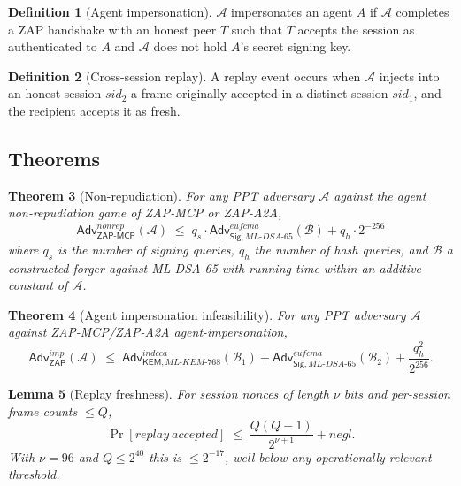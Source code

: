 \documentclass[11pt,a4paper]{article}
\newtheorem{theorem}{Theorem}
\newtheorem{lemma}[theorem]{Lemma}
\theoremstyle{definition}
\newtheorem{definition}[theorem]{Definition}
\theoremstyle{remark}
\newcommand{\zap}{\textsf{ZAP}\xspace}
\newcommand{\zapmcp}{\textsf{ZAP-MCP}\xspace}
\newcommand{\zapaa}{\textsf{ZAP-A2A}\xspace}
\newcommand{\Adv}{\mathsf{Adv}}
\newcommand{\KEM}{\textsf{KEM}}
\newcommand{\Sign}{\textsf{Sig}}
\begin{document}
\begin{definition}[Agent impersonation]
$\mathcal{A}$ impersonates an agent $A$ if $\mathcal{A}$ completes a
\zap{} handshake with an honest peer $T$ such that $T$ accepts the
session as authenticated to $A$ and $\mathcal{A}$ does not hold $A$'s
secret signing key.
\end{definition}

\begin{definition}[Cross-session replay]
A replay event occurs when $\mathcal{A}$ injects into an honest session
$\mathit{sid}_2$ a frame originally accepted in a distinct session
$\mathit{sid}_1$, and the recipient accepts it as fresh.
\end{definition}

\subsection{Theorems}

\begin{theorem}[Non-repudiation]\label{thm:nonrep}
For any PPT adversary $\mathcal{A}$ against the agent
non-repudiation game of \zapmcp{} or \zapaa{},
\[
\Adv^{\mathit{nonrep}}_{\zapmcp{}}(\mathcal{A}) \;\leq\;
q_s \cdot \Adv^{\mathit{eufcma}}_{\Sign,\mathit{ML\text{-}DSA\text{-}65}}(\mathcal{B})
+ q_h \cdot 2^{-256}
\]
where $q_s$ is the number of signing queries, $q_h$ the number of hash
queries, and $\mathcal{B}$ a constructed forger against ML-DSA-65 with
running time within an additive constant of $\mathcal{A}$.
\end{theorem}

\begin{theorem}[Agent impersonation infeasibility]\label{thm:imp}
For any PPT adversary $\mathcal{A}$ against \zapmcp{}/\zapaa{}
agent-impersonation,
\[
\Adv^{\mathit{imp}}_{\zap}(\mathcal{A}) \;\leq\;
\Adv^{\mathit{indcca}}_{\KEM,\mathit{ML\text{-}KEM\text{-}768}}(\mathcal{B}_1)
+ \Adv^{\mathit{eufcma}}_{\Sign,\mathit{ML\text{-}DSA\text{-}65}}(\mathcal{B}_2)
+ \frac{q_h^2}{2^{256}}.
\]
\end{theorem}

\begin{lemma}[Replay freshness]\label{lem:replay}
For session nonces of length $\nu$ bits and per-session frame counts
$\leq Q$,
\[
\Pr[\mathit{replay\ accepted}]
\;\leq\; \frac{Q(Q-1)}{2^{\nu+1}} + \mathit{negl}.
\]
With $\nu = 96$ and $Q \leq 2^{40}$ this is $\leq 2^{-17}$, well below
any operationally relevant threshold.
\end{lemma}
\end{document}
